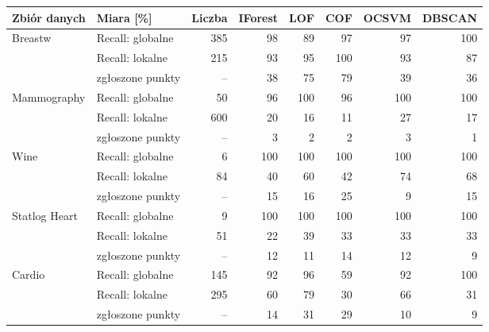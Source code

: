 \begin{tabular}{llrrrrrr}
\toprule
Zbiór danych & Miara [\%] & Liczba & IForest & LOF & COF & OCSVM & DBSCAN \\
\midrule
Breastw & Recall: globalne & 385 & 98 & 89 & 97 & 97 & 100 \\
 & Recall: lokalne & 215 & 93 & 95 & 100 & 93 & 87 \\
 & zgłoszone punkty & -- & 38 & 75 & 79 & 39 & 36 \\
Mammography & Recall: globalne & 50 & 96 & 100 & 96 & 100 & 100 \\
 & Recall: lokalne & 600 & 20 & 16 & 11 & 27 & 17 \\
 & zgłoszone punkty & -- & 3 & 2 & 2 & 3 & 1 \\
Wine & Recall: globalne & 6 & 100 & 100 & 100 & 100 & 100 \\
 & Recall: lokalne & 84 & 40 & 60 & 42 & 74 & 68 \\
 & zgłoszone punkty & -- & 15 & 16 & 25 & 9 & 15 \\
Statlog Heart & Recall: globalne & 9 & 100 & 100 & 100 & 100 & 100 \\
 & Recall: lokalne & 51 & 22 & 39 & 33 & 33 & 33 \\
 & zgłoszone punkty & -- & 12 & 11 & 14 & 12 & 9 \\
Cardio & Recall: globalne & 145 & 92 & 96 & 59 & 92 & 100 \\
 & Recall: lokalne & 295 & 60 & 79 & 30 & 66 & 31 \\
 & zgłoszone punkty & -- & 14 & 31 & 29 & 10 & 9 \\
\bottomrule
\end{tabular}
